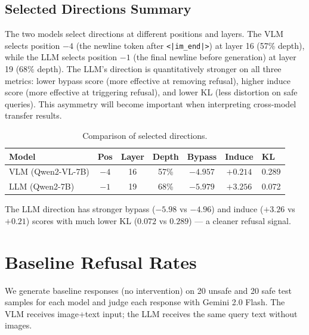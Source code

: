 \documentclass[11pt,a4paper]{article}
\begin{document}
\subsection{Selected Directions Summary}

The two models select directions at different positions and layers. The VLM selects position $-4$ (the newline token after \texttt{<|im\_end|>}) at layer 16 (57\% depth), while the LLM selects position $-1$ (the final newline before generation) at layer 19 (68\% depth). The LLM's direction is quantitatively stronger on all three metrics: lower bypass score (more effective at removing refusal), higher induce score (more effective at triggering refusal), and lower KL (less distortion on safe queries). This asymmetry will become important when interpreting cross-model transfer results.

\begin{table}[H]\centering
\caption{Comparison of selected directions.}
\begin{tabular}{lcccccl}
\toprule
\textbf{Model} & \textbf{Pos} & \textbf{Layer} & \textbf{Depth} & \textbf{Bypass} & \textbf{Induce} & \textbf{KL} \\
\midrule
VLM (Qwen2-VL-7B) & $-4$ & 16 & 57\% & $-4.957$ & $+0.214$ & 0.289 \\
LLM (Qwen2-7B)    & $-1$ & 19 & 68\% & $-5.979$ & $+3.256$ & 0.072 \\
\bottomrule
\end{tabular}
\end{table}

The LLM direction has stronger bypass ($-5.98$ vs $-4.96$) and induce ($+3.26$ vs $+0.21$) scores with much lower KL ($0.072$ vs $0.289$) --- a cleaner refusal signal.

\section{Baseline Refusal Rates}

We generate baseline responses (no intervention) on 20 unsafe and 20 safe test samples for each model and judge each response with Gemini 2.0 Flash. The VLM receives image+text input; the LLM receives the same query text without images.
\end{document}
